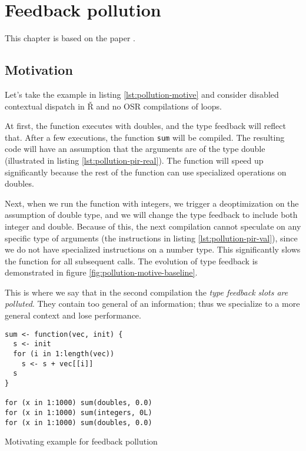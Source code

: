 \chapter{Feedback pollution}

\begin{chapterabstract}
	\todoadd
\end{chapterabstract}

This chapter is based on the paper \cite{feedback-vmil}.

\section{Motivation}

Let's take the example in listing \ref{lst:pollution-motive} and consider disabled contextual dispatch in Ř and no OSR compilations of loops.

At first, the function executes with doubles, and the type feedback will reflect that. After a few executions, the function \texttt{sum} will be compiled. The resulting code will have an assumption that the arguments are of the type double (illustrated in listing \ref{lst:pollution-pir-real}). The function will speed up significantly because the rest of the function can use specialized operations on doubles.

Next, when we run the function with integers, we trigger a deoptimization on the assumption of double type, and we will change the type feedback to include both integer and double. Because of this, the next compilation cannot speculate on any specific type of arguments (the instructions in listing \ref{lst:pollution-pir-val}), since we do not have specialized instructions on a number type. This significantly slows the function for all subsequent calls. The evolution of type feedback is demonstrated in figure \ref{fig:pollution-motive-baseline}.

This is where we say that in the second compilation the \textit{type feedback slots are polluted}. They contain too general of an information; thus we specialize to a more general context and lose performance.

\begin{listing}
	\begin{verbatim}
sum <- function(vec, init) {
  s <- init
  for (i in 1:length(vec))
    s <- s + vec[[i]]
  s
}

for (x in 1:1000) sum(doubles, 0.0)
for (x in 1:1000) sum(integers, 0L)
for (x in 1:1000) sum(doubles, 0.0)
  \end{verbatim}
	\caption{Motivating example for feedback pollution}\label{lst:pollution-motive}
\end{listing}

